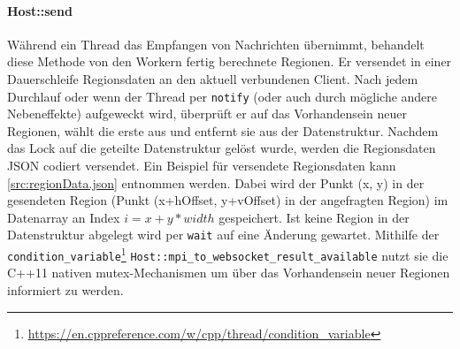 \begin{figure}
	
\end{figure}

\begin{figure}
	
\end{figure}

\paragraph{Host::send}\label{cls:Host::send}

Während ein Thread das Empfangen von Nachrichten übernimmt, behandelt diese Methode von den Workern fertig berechnete Regionen.
Er versendet in einer Dauerschleife Regionsdaten an den aktuell verbundenen Client.
Nach jedem Durchlauf oder wenn der Thread per \verb|notify| (oder auch durch mögliche andere Nebeneffekte) aufgeweckt wird,
überprüft er auf das Vorhandensein neuer Regionen, wählt die erste aus und entfernt sie aus der Datenstruktur.
Nachdem das Lock auf die geteilte Datenstruktur gelöst wurde, werden die Regionsdaten JSON codiert versendet.
Ein Beispiel für versendete Regionsdaten kann \autoref{src:regionData.json} entnommen werden.
Dabei wird der Punkt (x, y) in der gesendeten Region (Punkt (x+hOffset, y+vOffset) in der angefragten Region)
im Datenarray an Index $i = x + y * width$ gespeichert.
Ist keine Region in der Datenstruktur abgelegt wird per \verb|wait| auf eine Änderung gewartet.
Mithilfe der \verb|condition_variable|\footnote{\url{https://en.cppreference.com/w/cpp/thread/condition_variable}} \verb|Host::mpi_to_websocket_result_available|
nutzt sie die C++11 nativen mutex-Mechanismen um über das Vorhandensein neuer Regionen informiert zu werden.

\begin{figure}
	
\end{figure}

